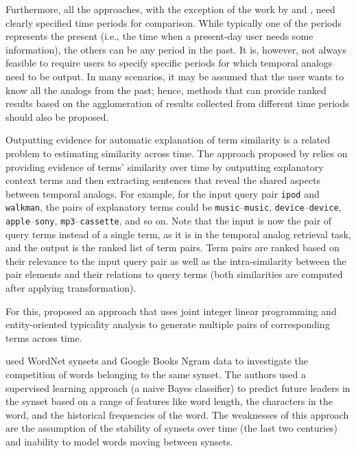 \documentclass[output=paper]{langsci/langscibook}
\begin{document}
Furthermore, all the approaches, with the exception of the work by \citet{tahmasebi2012neer} and \citet{kaluarachchi}, need clearly specified time periods for comparison. While typically one of the periods represents the present (i.e., the time when a present-day user needs some information), the others can be any period in the past. It is, however, not always feasible to require users to specify specific periods for which temporal analogs need to be output. In many scenarios, it may be assumed that the user wants to know all the analogs from the past; hence, methods that can provide ranked results based on the agglomeration of results collected from different time periods should also be proposed. 

Outputting evidence for automatic explanation of term similarity is a related problem to estimating similarity across time. The approach proposed by \citet{zhang2016towards} relies on providing evidence of terms' similarity over time by outputting explanatory context terms and then extracting sentences that reveal the shared aspects between temporal analogs. For example, for the input query pair \texttt{ipod} and \texttt{walkman}, the pairs of explanatory terms could be \texttt{music}--\texttt{music}, \texttt{device}--\texttt{device}, \texttt{apple}--\texttt{sony}, \texttt{mp3}--\texttt{cassette}, and so on. Note that the input is now the pair of query terms instead of a single term, as it is in the temporal analog retrieval task, and the output is the ranked list of term pairs.
Term pairs are ranked based on their relevance to the input query pair as well as the intra-similarity between the pair elements and their relations to query terms (both similarities are computed after applying transformation).

For this, \citet{duan2019mapping} proposed an approach that uses joint integer linear programming and entity-oriented typicality analysis to generate multiple pairs of corresponding terms across time.


\citet{turney2019natural} used WordNet synsets and Google Books Ngram data to investigate the competition of words belonging to the same synset. The authors used a supervised learning approach (a naive Bayes classifier) to predict future leaders in the synset based on a range of features like word length, the characters in the word, and the historical frequencies of the word. The weaknesses of this approach are the assumption of the stability of synsets over time (the last two centuries) and inability to model words moving between synsets.
\end{document}
